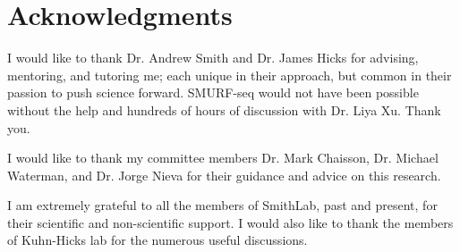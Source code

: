 \chapter*{Acknowledgments}
I would like to thank Dr. Andrew Smith and Dr. James Hicks for advising,
mentoring, and tutoring me; each unique in their approach, but common in
their passion to push science forward.  SMURF-seq would not have been
possible without the help and hundreds of hours of discussion with Dr.
Liya Xu. Thank you.

I would like to thank my committee members Dr. Mark Chaisson, Dr.
Michael Waterman, and Dr. Jorge Nieva for their guidance and advice on
this research.

I am extremely grateful to all the members of SmithLab, past and
present, for their scientific and non-scientific support.  I would also
like to thank the members of Kuhn-Hicks lab for the numerous useful
discussions.
